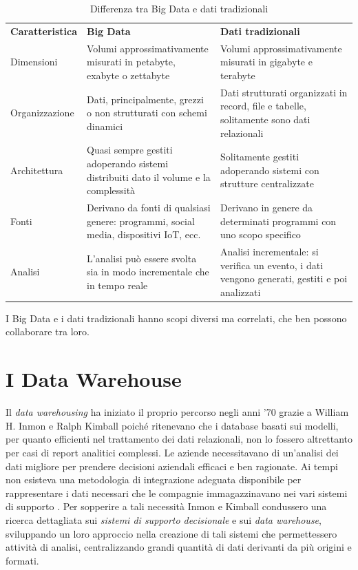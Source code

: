\begin{longtable}{|p{4cm}|p{5cm}|p{5cm}|}
    \label{tab: Big Data vs Traditional Data} \\
    \caption{Differenza tra Big Data e dati tradizionali} \\
    \hline
    \textbf{Caratteristica} & \textbf{Big Data} & \textbf{Dati tradizionali} \\
    \hline
    \endfirsthead 
        Dimensioni & Volumi approssimativamente misurati in petabyte, exabyte o zettabyte & Volumi approssimativamente misurati in gigabyte e terabyte\\
        \hline
        Organizzazione & Dati, principalmente, grezzi o non strutturati con schemi dinamici & Dati strutturati organizzati in record, file e tabelle, solitamente sono dati relazionali\\
        \hline
        Architettura & Quasi sempre gestiti adoperando sistemi distribuiti dato il volume e la complessità & Solitamente gestiti adoperando sistemi con strutture centralizzate\\
        \hline
        Fonti & Derivano da fonti di qualsiasi genere: programmi, social media, dispositivi IoT, ecc. & Derivano in genere da determinati programmi con uno scopo specifico\\
        \hline
        Analisi & L'analisi può essere svolta sia in modo incrementale che in tempo reale & Analisi incrementale: si verifica un evento, i dati vengono generati, gestiti e poi analizzati\\
        \hline
\end{longtable}

I Big Data e i dati tradizionali hanno scopi diversi ma correlati, che ben possono collaborare tra loro.

\section{I Data Warehouse}

Il \textit{data warehousing} ha iniziato il proprio percorso negli anni '70 grazie a William H. Inmon e Ralph Kimball poiché ritenevano che i database basati sui modelli, per quanto efficienti nel trattamento dei dati relazionali, non lo fossero altrettanto per casi di report analitici complessi. Le aziende necessitavano di un'analisi dei dati migliore per prendere decisioni aziendali efficaci e ben ragionate. Ai tempi non esisteva una metodologia di integrazione adeguata disponibile per rappresentare i dati necessari che le compagnie immagazzinavano nei vari sistemi di supporto \cite{researchgate_data_warehouse}.
Per sopperire a tali necessità Inmon e Kimball condussero una ricerca dettagliata sui \textit{sistemi di supporto decisionale} e sui \textit{data warehouse}, sviluppando un loro approccio nella creazione di tali sistemi che permettessero attività di analisi, centralizzando grandi quantità di dati derivanti da più origini e formati.

